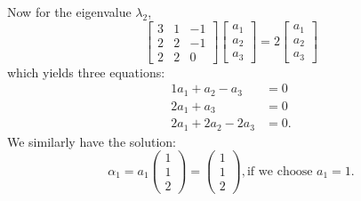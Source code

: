 \documentclass[main.tex]{subfiles}
\begin{document}
\begin{example}
Now for the eigenvalue $\lambda_2$, 
$$
\left[\begin{array}{rrr}
3 & 1 & -1 \\
2 & 2 & -1 \\
2 & 2 & 0
\end{array}\right]
\left[\begin{array}{l}
a_1 \\
a_2 \\
a_3
\end{array}\right]=
2
\left[\begin{array}{l}
a_1 \\
a_2 \\
a_3
\end{array}\right]
$$
which yields three equations:
$$
\begin{aligned}
1 a_1 + a_2 -  a_3 & =0 \\
2 a_1 + a_3 & =0 \\
2 a_1 + 2a_2 -  2a_3 & =0.
\end{aligned}
$$
We similarly have the solution:
$$
\alpha_1=
a_1\left(\begin{array}{l}
1 \\
1 \\
2
\end{array}\right) = 
\left(\begin{array}{l}
1 \\
1 \\
2
\end{array}\right), \text{if we choose } a_1 = 1.
$$

\end{example}
\end{document}
